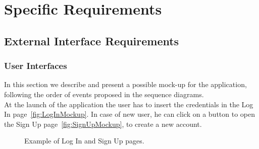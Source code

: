 \chapter{Specific Requirements}


\section{External Interface Requirements}

\subsection{User Interfaces}

In this section we describe and present a possible mock-up for the application, following the order of events proposed in the sequence diagrams.\\

At the launch of the application the user has to insert the credentials in the Log In page~\ref{fig:LogInMockup}. In case of new user, he can click on a button to open the Sign Up page~\ref{fig:SignUpMockup}, to create a new account.

\begin{figure}[H]
    \centering     %
    \caption{Example of Log In and Sign Up pages.}
\end{figure}

